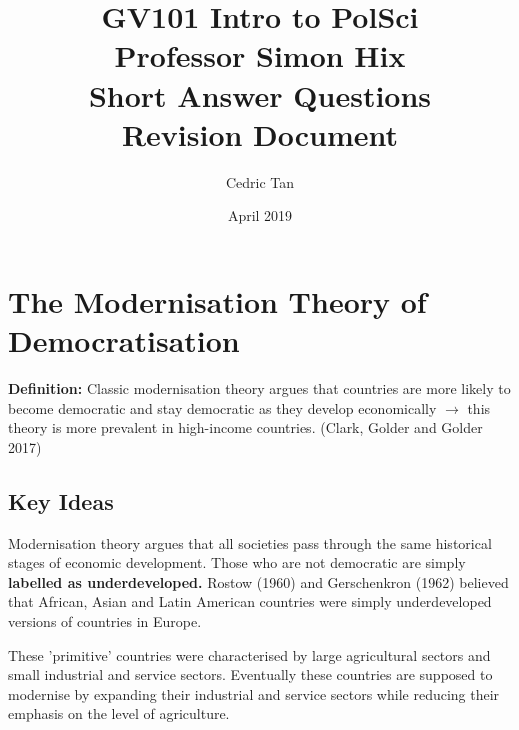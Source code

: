 \documentclass[12pt, letterpaper]{article}
\title{
	GV101 Intro to PolSci\\
	\large{Professor Simon Hix}\\
	\large{Short Answer Questions}\\ {Revision Document}
}
\author{Cedric Tan}
\date{April 2019}
\begin{document}
\maketitle
{}

\newpage
\tableofcontents
\newpage


\section{The Modernisation Theory of Democratisation}

\textbf{Definition:} Classic modernisation theory argues that countries are more likely to become democratic and stay democratic as they develop economically $\rightarrow$ this theory is more prevalent in high-income countries. (Clark, Golder and Golder 2017)

\subsection{Key Ideas}
Modernisation theory argues that all societies pass through the same historical stages of economic development. Those who are not democratic are simply \textbf{labelled as underdeveloped.} Rostow (1960) and Gerschenkron (1962) believed that African, Asian and Latin American countries were simply underdeveloped versions of countries in Europe.

These 'primitive' countries were characterised by large agricultural sectors and small industrial and service sectors. Eventually these countries are supposed to modernise by expanding their industrial and service sectors while reducing their emphasis on the level of agriculture.
\end{document}
